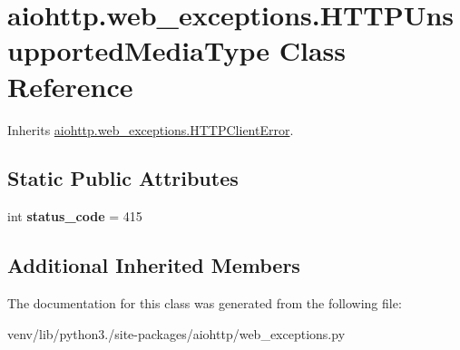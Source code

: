 \hypertarget{classaiohttp_1_1web__exceptions_1_1_h_t_t_p_unsupported_media_type}{}\section{aiohttp.\+web\+\_\+exceptions.\+H\+T\+T\+P\+Unsupported\+Media\+Type Class Reference}
\label{classaiohttp_1_1web__exceptions_1_1_h_t_t_p_unsupported_media_type}


Inherits \hyperlink{classaiohttp_1_1web__exceptions_1_1_h_t_t_p_client_error}{aiohttp.\+web\+\_\+exceptions.\+H\+T\+T\+P\+Client\+Error}.

\subsection*{Static Public Attributes}
\begin{DoxyCompactItemize}
\item 
\mbox{\label{classaiohttp_1_1web__exceptions_1_1_h_t_t_p_unsupported_media_type_af06678bd53bbe6b7f9abc1db671abb83}} 
int {\bfseries status\+\_\+code} = 415
\end{DoxyCompactItemize}
\subsection*{Additional Inherited Members}


The documentation for this class was generated from the following file\+:\begin{DoxyCompactItemize}
\item 
venv/lib/python3./site-\/packages/aiohttp/web\+\_\+exceptions.\+py\end{DoxyCompactItemize}
